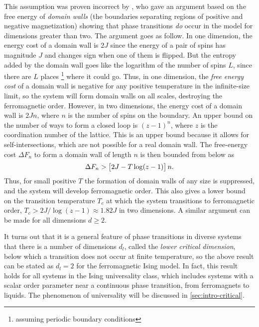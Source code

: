 This assumption was proven incorrect by \textcite{peierls1936ising}, who gave
an argument based on the free energy of \emph{domain walls} (the boundaries
separating regions of positive and negative magnetization) showing that phase
transitions \emph{do} occur in the model for dimensions greater than two. The
argument goes as follow. In one dimension, the energy cost of a domain wall is
$2J$ since the energy of a pair of spins has magnitude $J$ and changes sign
when one of them is flipped. But the entropy added by the domain wall goes like
the logarithm of the number of spins $L$, since there are $L$ places%
\footnote{assuming periodic boundary conditions} where it could go. Thus, in
one dimension, the \emph{free energy cost} of a domain wall is negative for any
positive temperature in the infinite-size limit, so the system will form domain
walls on all scales, destroying the ferromagnetic order. However, in two
dimensions, the energy cost of a domain wall is $2 J n$, where $n$ is the
number of spins on the boundary. An upper bound on the number of ways to form a
closed loop is $(z-1)^n$, where $z$ is the coordination number of the lattice.
This is an upper bound because it allows for self-intersections, which are not
possible for a real domain wall. The free-energy cost $\Delta F_n$ to form a
domain wall of length $n$ is then bounded from below as
\begin{equation}
  \Delta F_n > \left[2J - T \log(z-1)\right] n.
\end{equation}
Thus, for small positive $T$ the formation of domain walls of any size is
suppressed, and the system will develop ferromagnetic order. This also gives a
lower bound on the transition temperature $T_c$ at which the system transitions
to ferromagnetic order, $T_c > 2J/\log(z-1) \approx 1.82 J$ in two dimensions.
A similar argument can be made for all dimensions $d \geq 2$.

It turns out that it is a general feature of phase transitions in diverse
systems that there is a number of dimensions $d_l$, called the \emph{lower
  critical dimension}, below which a transition does not occur at finite
temperature, so the above result can be stated as $d_l=2$ for the ferromagnetic
Ising model. In fact, this result holds for all systems in the Ising
universality class, which includes systems with a scalar order parameter near a
continuous phase transition, from ferromagnets to liquids. The phenomenon of
universality will be discussed in \cref{sec:intro-critical}.

